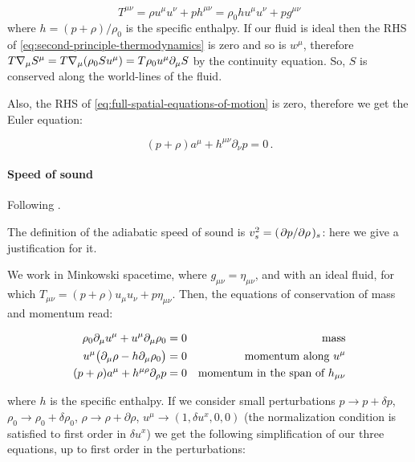 \documentclass[main.tex]{subfiles}
\begin{document}
\begin{equation}
    T^{\mu\nu} = \rho u^\mu u^\nu + p h^{\mu\nu} = \rho_0 h u^{\mu} u^\nu + p g^{\mu\nu}
\end{equation}
where \(h = (p + \rho) / \rho_0\) is the specific enthalpy.
If our fluid is ideal then the RHS of \eqref{eq:second-principle-thermodynamics} is zero and so is \(w^\mu\),
therefore \(T \nabla_\mu S^\mu = T \nabla_\mu \qty(\rho_0 S u^\mu) = T \rho_0 u^\mu \partial_\mu S\) by the continuity equation.
So, \(S\) is conserved along the world-lines of the fluid.

Also, the RHS of \eqref{eq:full-spatial-equations-of-motion} is zero, therefore we get the Euler equation:

\begin{equation} \label{eq:relativistic-euler}
    (p+\rho) a^\mu + h^{\mu \nu} \partial_\nu p =0 \,.
\end{equation}

\paragraph{Speed of sound}

Following \cite[]{Yoshida:2011}.

The definition of the adiabatic speed of sound is \(v_s^2 = (\pdv*{p}{\rho})_s\): here we give a justification for it.

We work in Minkowski spacetime, where \(g_{\mu\nu} = \eta_{\mu\nu}\), and with an ideal fluid, for which \(T_{\mu\nu} = (p+ \rho) u_\mu u_\nu + p \eta_{\mu\nu}\). Then, the equations of conservation of mass and momentum read:

\begin{subequations}
\begin{align}
  \rho_0 \partial_\mu u^\mu + u^\mu \partial_\mu \rho_0 &= 0 & \text{mass}  \\
  u^\mu \qty(\partial_\mu \rho - h \partial_\mu \rho_0) &=0 & \text{momentum along } u^\mu  \\
  (p+\rho) a^\mu + h^{\mu \rho} \partial_\rho p &=0 & \text{momentum in the span of } h_{\mu\nu}
\end{align}
\end{subequations}

where \(h\) is the specific enthalpy.
If we consider small perturbations \(p \rightarrow p + \delta p\), \(\rho_0 \rightarrow \rho_0 + \delta \rho_0\), \(\rho \rightarrow \rho + \partial \rho\), \(u^\mu \rightarrow (1, \delta u^x, 0, 0)\)
(the normalization condition is satisfied to first order in \(\delta u^x\))
we get the following simplification of our three equations, up to first order in the perturbations:
\end{document}
